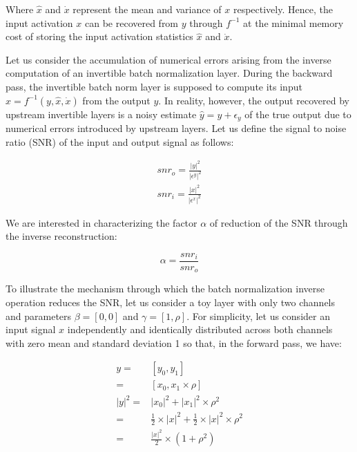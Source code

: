 \documentclass[twocolumn]{bmcart}
\begin{document}
Where $\hat{x}$ and $\dot{x}$ represent the mean and variance of $x$ respectively.
Hence, the input activation $x$ can be recovered from $y$ through $f^{-1}$ at the minimal memory cost of storing the input activation statistics $\hat{x}$ and $\dot{x}$.

Let us consider the accumulation of numerical errors arising from the inverse computation of an invertible batch normalization layer.
During the backward pass, the invertible batch norm layer is supposed to compute its input $x=f^{-1}(y, \hat{x}, \dot{x})$ from the output $y$.
In reality, however, the output recovered by upstream invertible layers is a noisy estimate $\hat{y}=y+\epsilon_y$ of the true output due to numerical errors introduced by upstream layers.
Let us define the signal to noise ratio (SNR) of the input and output signal as follows:

\begin{subequations}
\begin{align}
snr_o = \frac{|y|^2}{|\epsilon^y|^2} \\
snr_i = \frac{|x|^2}{|\epsilon^x|^2}  
\end{align}
\end{subequations}

We are interested in characterizing the factor $\alpha$ of reduction of the SNR through the inverse reconstruction:

\begin{equation}
\alpha = \frac{snr_i}{snr_o}
\end{equation}

To illustrate the mechanism through which the batch normalization inverse operation reduces the SNR, 
let us consider a toy layer with only two channels and parameters $\beta=[0,0]$ and $\gamma = [1, \rho]$. 
For simplicity, let us consider an input signal $x$ independently and identically distributed across both channels 
with zero mean and standard deviation 1 so that, in the forward pass, we have:

\begin{subequations}
\begin{align}
 y =& [y_0, y_1] \\
   =& [x_0, x_1 \times \rho] \\
|y|^2 =& |x_0|^2 + |x_1|^2 \times \rho^2 \\
      =& \frac{1}{2} \times |x|^2 + \frac{1}{2} \times |x|^2 \times \rho^2 \\
      =& \frac{|x|^2}{2} \times (1+\rho^2)
\end{align}
\end{subequations}
\end{document}
